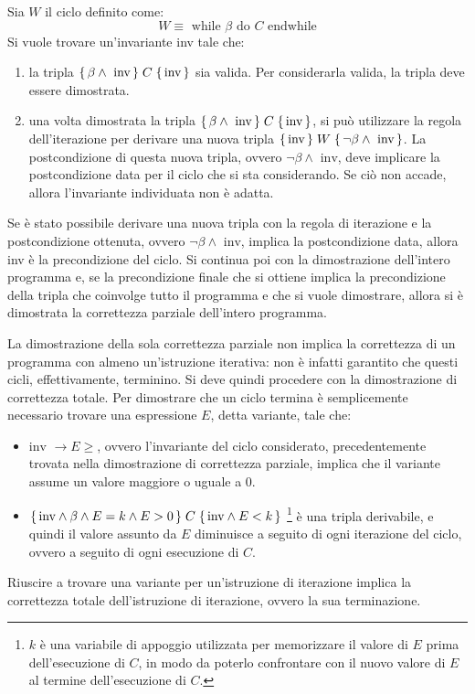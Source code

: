 Sia $W$ il ciclo definito come:
\[
    W \equiv \text{ while } \beta \text{ do } C \text{ endwhile}
\]
Si vuole trovare un'invariante inv tale che:
\begin{enumerate}
    \item la tripla $\Hoaretriple{\beta \land \text{ inv}}{C}{\text{inv}}$
    sia valida. Per considerarla valida, la tripla deve essere dimostrata.
    \item una volta dimostrata la tripla
    $\Hoaretriple{\beta \land \text{ inv}}{C}{\text{inv}}$, si può utilizzare
    la regola dell'iterazione per derivare una nuova tripla
    $\Hoaretriple{\text{inv}}{W}{\lnot \beta \land \text{ inv}}$.
    La postcondizione di questa nuova tripla, ovvero
    $\lnot \beta \land \text{ inv}$, deve implicare la postcondizione
    data per il ciclo che si sta considerando. Se ciò non accade, allora
    l'invariante individuata non è adatta.
\end{enumerate}
Se è stato possibile derivare una nuova tripla con la regola di
iterazione e la postcondizione ottenuta, ovvero $\lnot \beta \land \text{ inv}$,
implica la postcondizione data, allora inv è la precondizione del ciclo.
Si continua poi con la dimostrazione dell'intero programma e, se la precondizione
finale che si ottiene implica la precondizione della tripla che coinvolge
tutto il programma e che si vuole dimostrare, allora si è dimostrata la correttezza
parziale dell'intero programma.

La dimostrazione della sola correttezza parziale non implica la correttezza
di un programma con almeno un'istruzione iterativa: non è infatti garantito
che questi cicli, effettivamente, terminino. Si deve quindi procedere con
la dimostrazione di correttezza totale.
Per dimostrare che un ciclo termina è semplicemente necessario trovare
una espressione $E$, detta variante, tale che:
\begin{itemize}
    \item $\text{inv } \rightarrow E \ge$, ovvero l'invariante del ciclo considerato,
    precedentemente trovata nella dimostrazione di correttezza parziale,
    implica che il variante assume un valore maggiore o uguale a 0.
    \item $\Hoaretriple{\tn{inv} \land \beta \land E = k \land E > 0}{C}{\tn{inv} \land E < k}$
    \footnote{$k$ è una variabile di appoggio utilizzata per memorizzare
    il valore di $E$ prima dell'esecuzione di $C$, in modo da poterlo
    confrontare con il nuovo valore di $E$ al termine dell'esecuzione di $C$.}
    è una tripla derivabile, e quindi il valore assunto da $E$ diminuisce a
    seguito di ogni iterazione del ciclo, ovvero a seguito di ogni esecuzione
    di $C$.
\end{itemize}
Riuscire a trovare una variante per un'istruzione di iterazione implica la
correttezza totale dell'istruzione di iterazione, ovvero la sua terminazione.

